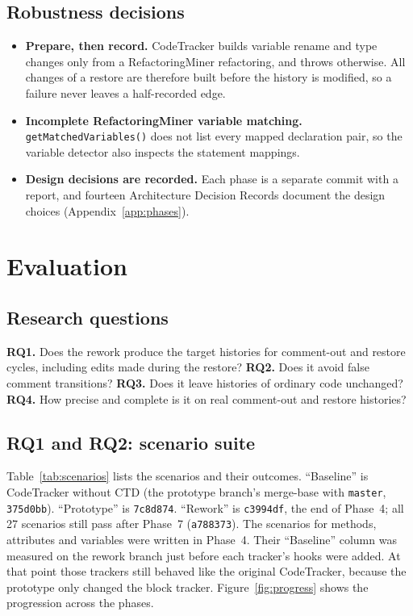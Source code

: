 \documentclass[11pt,a4paper]{article}
\newcommand{\code}[1]{\texttt{#1}}
\begin{document}
\subsection{Robustness decisions}
\begin{itemize}
  \item \textbf{Prepare, then record.} CodeTracker builds variable rename and type changes only from a RefactoringMiner refactoring, and throws otherwise. All changes of a restore are therefore built before the history is modified, so a failure never leaves a half-recorded edge.
  \item \textbf{Incomplete RefactoringMiner variable matching.} \code{getMatchedVariables()} does not list every mapped declaration pair, so the variable detector also inspects the statement mappings.
  \item \textbf{Design decisions are recorded.} Each phase is a separate commit with a report, and fourteen Architecture Decision Records document the design choices (Appendix~\ref{app:phases}).
\end{itemize}

\section{Evaluation}\label{sec:eval}

\subsection{Research questions}
\textbf{RQ1.} Does the rework produce the target histories for comment-out and restore cycles, including edits made during the restore?
\textbf{RQ2.} Does it avoid false comment transitions?
\textbf{RQ3.} Does it leave histories of ordinary code unchanged?
\textbf{RQ4.} How precise and complete is it on real comment-out and restore histories?

\subsection{RQ1 and RQ2: scenario suite}
Table~\ref{tab:scenarios} lists the scenarios and their outcomes. ``Baseline'' is CodeTracker without CTD (the prototype branch's merge-base with \code{master}, \code{375d0bb}). ``Prototype'' is \code{7c8d874}. ``Rework'' is \code{c3994df}, the end of Phase~4; all 27 scenarios still pass after Phase~7 (\code{a788373}). The scenarios for methods, attributes and variables were written in Phase~4. Their ``Baseline'' column was measured on the rework branch just before each tracker's hooks were added. At that point those trackers still behaved like the original CodeTracker, because the prototype only changed the block tracker. Figure~\ref{fig:progress} shows the progression across the phases.
\end{document}
